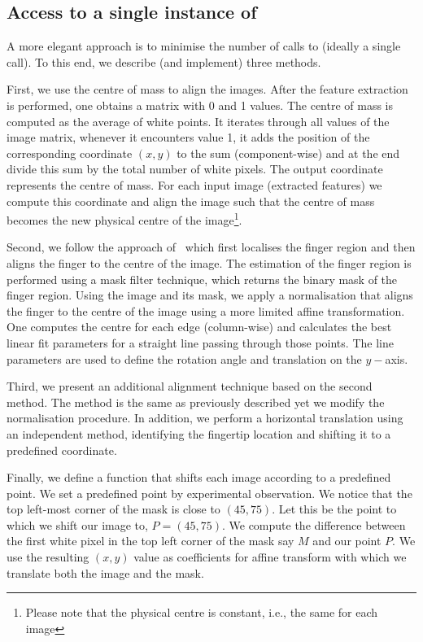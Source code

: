 \subsection{Access to a single instance of \rep }
A more elegant approach is to minimise the number of calls to \rep (ideally a single call). To this end, we describe (and implement) three methods.

First, we use the centre of mass to align the images. After the feature extraction is performed, one obtains a matrix with 0 and 1 values.
The centre of mass is computed as the average of white points. It iterates through all values of the image matrix, whenever it encounters value 1, it adds the position of the corresponding coordinate $(x,y)$ to the sum (component-wise) and at the end divide this sum by the total number of white pixels. The output coordinate represents the centre of mass. 
For each input image (extracted features) we compute this coordinate and align the image such that the centre of mass becomes the new physical centre of the image\footnote{Please note that the physical centre is constant, i.e., the same for each image}.

Second, we follow the approach of~\cite{entropyfv,normalization} which first localises the finger region and then aligns the finger to the centre of the image.
The estimation of the finger region is performed using a mask filter technique, which returns the binary mask of the finger region. Using the image and its mask, we apply a normalisation that aligns the finger to the centre of the image using a more limited affine transformation. One computes the centre for each edge (column-wise) and calculates the best linear fit parameters for a straight line passing through those points. The line parameters are used to define the rotation angle and translation on the $y-$axis. 

Third, we present an additional alignment technique based on the second method. The method is the same as previously described yet we modify the normalisation procedure. In addition, we perform a horizontal translation using an independent method, identifying the fingertip location and shifting it to a predefined coordinate.

Finally, we define a function that shifts each image according to a predefined point. We set a predefined point by experimental observation. We notice that the top left-most corner of the mask is close to $(45,75)$. Let this be the point to which we shift our image to, $P=(45,75)$. We compute the difference between the first white pixel in the top left corner of the mask say $M$ and our point $P$. We use the resulting $(x,y)$ value as coefficients for affine transform with which we translate both the image and the mask.



